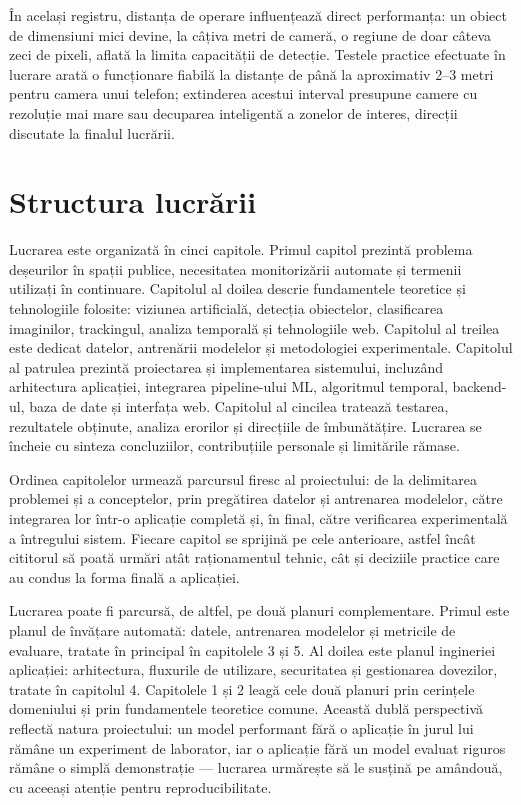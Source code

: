 În același registru, distanța de operare influențează direct performanța: un obiect de dimensiuni mici devine, la câțiva metri de cameră, o regiune de doar câteva zeci de pixeli, aflată la limita capacității de detecție. Testele practice efectuate în lucrare arată o funcționare fiabilă la distanțe de până la aproximativ 2--3 metri pentru camera unui telefon; extinderea acestui interval presupune camere cu rezoluție mai mare sau decuparea inteligentă a zonelor de interes, direcții discutate la finalul lucrării.

\section*{Structura lucrării}
{}

Lucrarea este organizată în cinci capitole. Primul capitol prezintă problema deșeurilor în spații publice, necesitatea monitorizării automate și termenii utilizați în continuare. Capitolul al doilea descrie fundamentele teoretice și tehnologiile folosite: viziunea artificială, detecția obiectelor, clasificarea imaginilor, trackingul, analiza temporală și tehnologiile web. Capitolul al treilea este dedicat datelor, antrenării modelelor și metodologiei experimentale. Capitolul al patrulea prezintă proiectarea și implementarea sistemului, incluzând arhitectura aplicației, integrarea pipeline-ului ML, algoritmul temporal, backend-ul, baza de date și interfața web. Capitolul al cincilea tratează testarea, rezultatele obținute, analiza erorilor și direcțiile de îmbunătățire. Lucrarea se încheie cu sinteza concluziilor, contribuțiile personale și limitările rămase.

Ordinea capitolelor urmează parcursul firesc al proiectului: de la delimitarea problemei și a conceptelor, prin pregătirea datelor și antrenarea modelelor, către integrarea lor într-o aplicație completă și, în final, către verificarea experimentală a întregului sistem. Fiecare capitol se sprijină pe cele anterioare, astfel încât cititorul să poată urmări atât raționamentul tehnic, cât și deciziile practice care au condus la forma finală a aplicației.

Lucrarea poate fi parcursă, de altfel, pe două planuri complementare. Primul este planul de învățare automată: datele, antrenarea modelelor și metricile de evaluare, tratate în principal în capitolele 3 și 5. Al doilea este planul ingineriei aplicației: arhitectura, fluxurile de utilizare, securitatea și gestionarea dovezilor, tratate în capitolul 4. Capitolele 1 și 2 leagă cele două planuri prin cerințele domeniului și prin fundamentele teoretice comune. Această dublă perspectivă reflectă natura proiectului: un model performant fără o aplicație în jurul lui rămâne un experiment de laborator, iar o aplicație fără un model evaluat riguros rămâne o simplă demonstrație --- lucrarea urmărește să le susțină pe amândouă, cu aceeași atenție pentru reproducibilitate.

